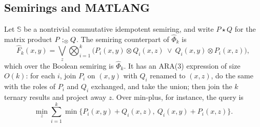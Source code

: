 \subsection{Semirings and MATLANG}\label{app:af-semiring}
Let $\mathbb S$ be a nontrivial commutative idempotent semiring, and
write $P\star Q$ for the matrix product $P\mathbin{;_{\otimes}} Q$. The semiring
counterpart of $\widehat\Phi_k$ is
\begin{equation}\label{eq:af-weighted}
 \widehat F_k(x,y)=\bigvee_z\bigotimes_{i=1}^k
 \bigl(P_i(x,y)\otimes Q_i(x,z)\ \vee\ Q_i(x,y)\otimes P_i(x,z)\bigr),
\end{equation}
which over the Boolean semiring is $\widehat\Phi_k$. It has an ARA(3)
expression of size $O(k)$: for each $i$, join $P_i$ on $(x,y)$ with $Q_i$
renamed to $(x,z)$, do the same with the roles of $P_i$ and $Q_i$
exchanged, and take the union; then join the $k$ ternary results and
project away $z$.
Over min-plus, for instance, the query is
\[
 \min_z\sum_{i=1}^k
 \min\{P_i(x,y)+Q_i(x,z),\ Q_i(x,y)+P_i(x,z)\}.
\]

